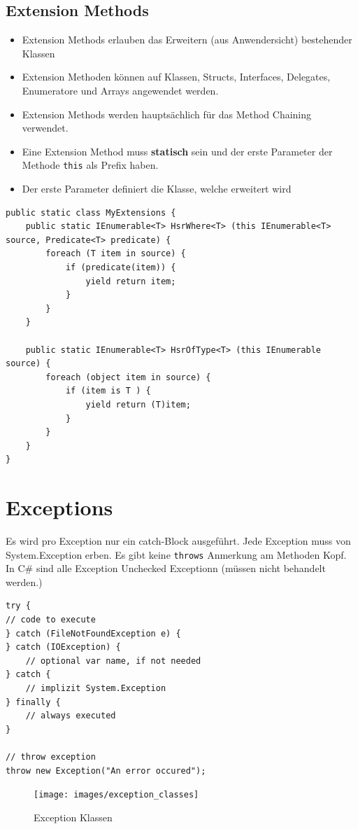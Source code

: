\subsection{Extension Methods}
\begin{itemize}
	\item Extension Methods erlauben das Erweitern (aus Anwendersicht) bestehender Klassen
	\item Extension Methoden können auf Klassen, Structs, Interfaces, Delegates, Enumeratore und Arrays angewendet werden.
	\item Extension Methods werden hauptsächlich für das Method Chaining verwendet.
	\item Eine Extension Method muss \textbf{statisch} sein und der erste Parameter der Methode \lstinline|this| als Prefix haben. 
	\item Der erste Parameter definiert die Klasse, welche erweitert wird
\end{itemize}
\begin{lstlisting}
public static class MyExtensions {
	public static IEnumerable<T> HsrWhere<T> (this IEnumerable<T> source, Predicate<T> predicate) {
		foreach (T item in source) {
			if (predicate(item)) {
				yield return item;
			}
		}
	}
	
	public static IEnumerable<T> HsrOfType<T> (this IEnumerable source) {
		foreach (object item in source) {
			if (item is T ) {
				yield return (T)item;
			}
		}
	}
}
\end{lstlisting}

\section{Exceptions}
Es wird pro Exception nur ein catch-Block ausgeführt. Jede Exception muss von System.Exception erben. Es gibt keine \lstinline|throws| Anmerkung am Methoden Kopf. In C\# sind alle Exception Unchecked Exceptionn (müssen nicht behandelt werden.)
\begin{lstlisting}
try {
// code to execute
} catch (FileNotFoundException e) {
} catch (IOException) {
	// optional var name, if not needed
} catch {
	// implizit System.Exception
} finally {
	// always executed
}

// throw exception
throw new Exception("An error occured");
\end{lstlisting}


\begin{figure}[h]
	\centering
	\texttt{[image: images/exception\_classes]}
	\caption{Exception Klassen}
	\label{fig:exceptionclasses}
\end{figure}

